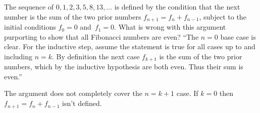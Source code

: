 \documentclass{ibl}  %
\begin{document}
\begin{ex}
The sequence of 
$0,1,2,3,5,8,13, \ldots$ is defined by the condition that 
the next number is the sum of the 
two prior numbers $f_{n+1}=f_n+f_{n-1}$, subject to the initial conditions
$f_0=0$ and~$f_1=0$.
What is wrong with this argument purporting to show that
all Fibonacci numbers are even?
``The $n=0$ base case is clear.  For the inductive step, assume the statement 
is true for all cases up to and including $n=k$.
By definition 
the next case $f_{k+1}$ is the sum of the two prior numbers, which by
the inductive hypothesis are both even.  
Thus their sum is even.''   
\begin{ans}
The argument does not completely cover the $n=k+1$ case.
If $k=0$ then $f_{n+1}=f_n+f_{n-1}$ isn't defined.  
\end{ans}
\end{ex}
\end{document}
